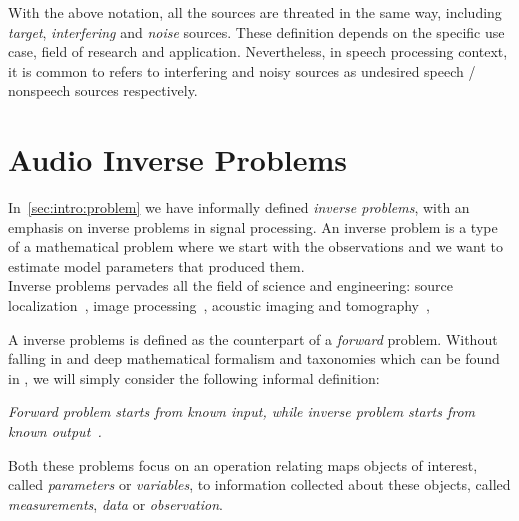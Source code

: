 With the above notation, all the sources are threated in the same way, including \textit{target}, \textit{interfering} and \textit{noise} sources.
These definition depends on the specific use case, field of research and application.
Nevertheless, in speech processing context,
it is common to refers to interfering and noisy sources as undesired speech \vs/ nonspeech sources respectively.

\section{Audio Inverse Problems}
\cite{kitic2015cosparse}
In~\cref{sec:intro:problem} we have informally defined \textit{inverse problems}, with an emphasis on inverse problems in signal processing.
An inverse problem is a type of a mathematical problem where we start with the observations and we want to estimate model parameters that produced them.
\\Inverse problems pervades all the field of science and engineering:
source localization~\cite{},
image processing~\cite{},
acoustic imaging and tomography~\cite{},

A inverse problems is defined as the counterpart of a \textit{forward} problem.
Without falling in and deep mathematical formalism and taxonomies which can be found in ,
we will simply consider the following informal definition:
\begin{center}
    \textit{\emph{Forward problem} starts from known input, while \emph{inverse problem} starts from known output~\cite{santamarina2005discrete}.}
\end{center}
Both these problems focus on an operation relating maps objects of interest, called \textit{parameters} or \textit{variables},
to information collected about these objects, called \textit{measurements}, \textit{data} or \textit{observation}.

